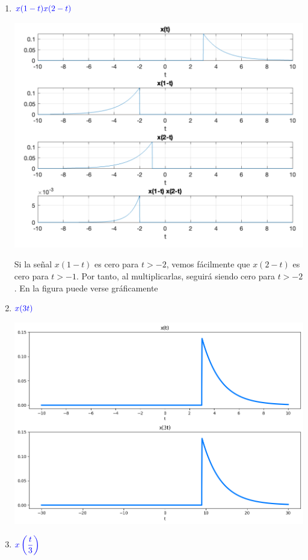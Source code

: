 \begin{enumerate}[label=\color{red}\textbf{\arabic*)}, leftmargin=*]
\begin{enumerate}[label=\color{red}\alph*)]
		
		\item $\textcolor{blue}{x(1-t)x(2-t)}$
		
		\begin{minipage}{0.55\textwidth}
				\includegraphics[width=\linewidth]{"Temas/Tema 1/screenshot002.png"}
				\end{minipage}\qquad\begin{minipage}{0.35\textwidth}
				Si la señal $x(1-t)$ es cero para $t>-2$, vemos fácilmente que $x(2-t)$ es cero para $t>-1$. Por tanto, al multiplicarlas, seguirá siendo cero para $t>-2$. En la figura puede verse gráficamente
				\end{minipage}
		\item $\textcolor{blue}{x(3t)}$
		
		\begin{center}
			\includegraphics[width=0.7\linewidth]{"Temas/Tema 1/screenshot015"}
		\end{center}
		
		\item $\textcolor{blue}{x\left(\dfrac{t}{3}\right)}$
		

\end{enumerate}
\end{enumerate}
